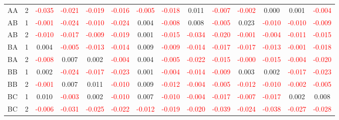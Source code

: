 \begin{table}[!htb]
{\begin{tabular}{llcccccccccccc}
AA & 2 & \textcolor{red}{-0.035} & \textcolor{red}{-0.021} & \textcolor{red}{-0.019} & \textcolor{red}{-0.016} & \textcolor{red}{-0.005} & \textcolor{red}{-0.018} & 0.011 & \textcolor{red}{-0.007} & \textcolor{red}{-0.002} & 0.000 & 0.001 & \textcolor{red}{-0.004}\\
AB & 1 & \textcolor{red}{-0.001} & \textcolor{red}{-0.024} & \textcolor{red}{-0.010} & \textcolor{red}{-0.024} & 0.004 & \textcolor{red}{-0.008} & 0.008 & \textcolor{red}{-0.005} & 0.023 & \textcolor{red}{-0.010} & \textcolor{red}{-0.010} & \textcolor{red}{-0.009}\\
AB & 2 & \textcolor{red}{-0.010} & \textcolor{red}{-0.017} & \textcolor{red}{-0.009} & \textcolor{red}{-0.019} & 0.001 & \textcolor{red}{-0.015} & \textcolor{red}{-0.034} & \textcolor{red}{-0.020} & \textcolor{red}{-0.001} & \textcolor{red}{-0.004} & \textcolor{red}{-0.011} & \textcolor{red}{-0.015}\\
BA & 1 & 0.004 & \textcolor{red}{-0.005} & \textcolor{red}{-0.013} & \textcolor{red}{-0.014} & 0.009 & \textcolor{red}{-0.009} & \textcolor{red}{-0.014} & \textcolor{red}{-0.017} & \textcolor{red}{-0.017} & \textcolor{red}{-0.013} & \textcolor{red}{-0.001} & \textcolor{red}{-0.018}\\
BA & 2 & \textcolor{red}{-0.008} & 0.007 & 0.002 & \textcolor{red}{-0.004} & 0.004 & \textcolor{red}{-0.005} & \textcolor{red}{-0.022} & \textcolor{red}{-0.015} & \textcolor{red}{-0.000} & \textcolor{red}{-0.015} & \textcolor{red}{-0.004} & \textcolor{red}{-0.020}\\
BB & 1 & 0.002 & \textcolor{red}{-0.024} & \textcolor{red}{-0.017} & \textcolor{red}{-0.023} & 0.001 & \textcolor{red}{-0.004} & \textcolor{red}{-0.014} & \textcolor{red}{-0.009} & 0.003 & 0.002 & \textcolor{red}{-0.017} & \textcolor{red}{-0.023}\\
BB & 2 & \textcolor{red}{-0.001} & 0.007 & 0.011 & \textcolor{red}{-0.010} & 0.009 & \textcolor{red}{-0.012} & \textcolor{red}{-0.004} & \textcolor{red}{-0.005} & \textcolor{red}{-0.012} & \textcolor{red}{-0.010} & \textcolor{red}{-0.002} & \textcolor{red}{-0.005}\\
BC & 1 & 0.010 & \textcolor{red}{-0.003} & 0.002 & \textcolor{red}{-0.010} & 0.007 & \textcolor{red}{-0.010} & \textcolor{red}{-0.004} & \textcolor{red}{-0.017} & \textcolor{red}{-0.007} & \textcolor{red}{-0.017} & 0.002 & 0.008\\
BC & 2 & \textcolor{red}{-0.006} & \textcolor{red}{-0.031} & \textcolor{red}{-0.025} & \textcolor{red}{-0.022} & \textcolor{red}{-0.012} & \textcolor{red}{-0.019} & \textcolor{red}{-0.020} & \textcolor{red}{-0.039} & \textcolor{red}{-0.024} & \textcolor{red}{-0.038} & \textcolor{red}{-0.027} & \textcolor{red}{-0.028}\\

\end{tabular}}
\end{table}
